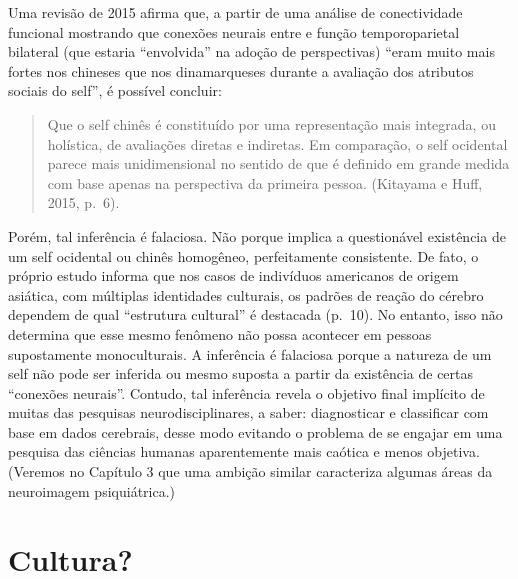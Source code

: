 Uma revisão de 2015 afirma que, a partir de uma análise de conectividade
funcional mostrando que conexões neurais entre  e função
temporoparietal bilateral (que estaria ``envolvida'' na adoção de
perspectivas) ``eram muito mais fortes nos chineses que nos
dinamarqueses durante a avaliação dos atributos sociais do self'', é
possível concluir:

\begin{quote}
Que o self chinês é constituído por uma representação mais integrada, ou
holística, de avaliações diretas e indiretas. Em comparação, o self
ocidental parece mais unidimensional no sentido de que é definido em
grande medida com base apenas na perspectiva da primeira pessoa.
(Kitayama e Huff, 2015, p.~6).
\end{quote}

Porém, tal inferência é falaciosa. Não porque implica a questionável
existência de um self ocidental ou chinês homogêneo, perfeitamente
consistente. De fato, o próprio estudo informa que nos casos de
indivíduos americanos de origem asiática, com múltiplas identidades
culturais, os padrões de reação do cérebro dependem de qual ``estrutura
cultural'' é destacada (p.~10). No entanto, isso não determina que esse
mesmo fenômeno não possa acontecer em pessoas supostamente
monoculturais. A inferência é falaciosa porque a natureza de um self não
pode ser inferida ou mesmo suposta a partir da existência de certas
``conexões neurais''. Contudo, tal inferência revela o objetivo final
implícito de muitas das pesquisas neurodisciplinares, a saber:
diagnosticar e classificar com base em dados cerebrais, desse modo
evitando o problema de se engajar em uma pesquisa das ciências humanas
aparentemente mais caótica e menos objetiva. (Veremos no Capítulo 3 que
uma ambição similar caracteriza algumas áreas da neuroimagem
psiquiátrica.)

\chapter{Cultura?}

